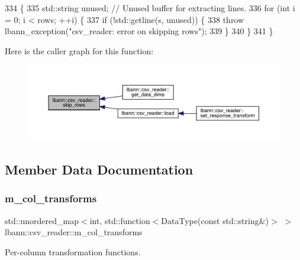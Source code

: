 \begin{DoxyCode}
334                                                    \{
335   std::string unused;  \textcolor{comment}{// Unused buffer for extracting lines.}
336   \textcolor{keywordflow}{for} (\textcolor{keywordtype}{int} i = 0; i < rows; ++i) \{
337     \textcolor{keywordflow}{if} (!std::getline(s, unused)) \{
338       \textcolor{keywordflow}{throw} lbann\_exception(\textcolor{stringliteral}{"csv\_reader: error on skipping rows"});
339     \}
340   \}
341 \}
\end{DoxyCode}
Here is the caller graph for this function\+:\nopagebreak
\begin{figure}[H]
\begin{center}
\leavevmode
\includegraphics[width=350pt]{classlbann_1_1csv__reader_ace1c71ad266e6bd85573051ff45277ab_icgraph}
\end{center}
\end{figure}


\subsection{Member Data Documentation}
\mbox{\label{classlbann_1_1csv__reader_aad98a20225b1f2545de32b4c19c8285b}} 
\subsubsection{\texorpdfstring{m\+\_\+col\+\_\+transforms}{m\_col\_transforms}}
{\footnotesize\ttfamily std\+::unordered\+\_\+map$<$int, std\+::function$<$Data\+Type(const std\+::string\&)$>$ $>$ lbann\+::csv\+\_\+reader\+::m\+\_\+col\+\_\+transforms\hspace{0.3cm}{\ttfamily [protected]}}



Per-\/column transformation functions. 



